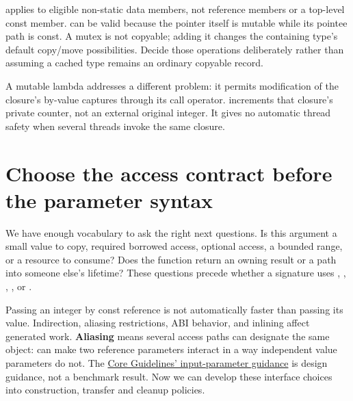  applies to eligible non-static data members, not reference members or a top-level const member.  can be valid because the pointer itself is mutable while its pointee path is const. A mutex is not copyable; adding it changes the containing type's default copy/move possibilities. Decide those operations deliberately rather than assuming a cached type remains an ordinary copyable record.

A mutable lambda addresses a different problem: it permits modification of the closure's by-value captures through its call operator.  increments that closure's private counter, not an external original integer. It gives no automatic thread safety when several threads invoke the same closure.

\section{Choose the access contract before the parameter syntax}\label{01-foundations-i-ch003-choose-the-access-contract-before-the-parameter-syntax}

\hypertarget{01-foundations-i-ch003-choose-the-access-contract-before-the-parameter-syntax}{}

We have enough vocabulary to ask the right next questions. Is this argument a small value to copy, required borrowed access, optional access, a bounded range, or a resource to consume? Does the function return an owning result or a path into someone else's lifetime? These questions precede whether a signature uses , , , , or .

Passing an integer by const reference is not automatically faster than passing its value. Indirection, aliasing restrictions, ABI behavior, and inlining affect generated work. \textbf{Aliasing} means several access paths can designate the same object:  can make two reference parameters interact in a way independent value parameters do not. The \href{https://isocpp.github.io/CppCoreGuidelines/CppCoreGuidelines\#f16-for-in-parameters-pass-cheaply-copied-types-by-value-and-others-by-reference-to-const}{Core Guidelines' input-parameter guidance} is design guidance, not a benchmark result. Now we can develop these interface choices into construction, transfer and cleanup policies.

